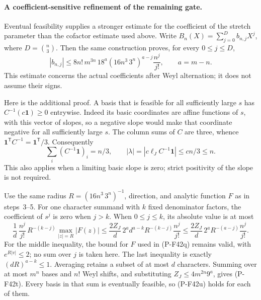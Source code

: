 \documentclass[11pt,a4paper]{article}
\begin{document}
\paragraph{A coefficient-sensitive refinement of the remaining gate.}
Eventual feasibility supplies a stronger estimate for the coefficient
of the stretch parameter than the cofactor estimate used above.
Write \(B_n(X)=\sum_{j=0}^{D}b_{n,j}X^j\), where
\(D=\binom n3\). Then the same construction proves, for every
\(0\le j\le D\),
\[
 |b_{n,j}|
 \le 8n!\,m^{3n}\,18^a
       (16n^3\,3^n)^{a-j}\frac{n^j}{j!},
 \qquad a=m-n.
 \tag{P-F42t}
\]
This estimate concerns the actual coefficients after Weyl
alternation; it does not assume their signs.

Here is the additional proof. A basis that is feasible for all
sufficiently large \(s\) has
\(C^{-1}(c\mathbf1)\ge0\) entrywise. Indeed its basic
coordinates are affine functions of \(s\), with this vector
of slopes, so a negative slope would make that coordinate
negative for all sufficiently large \(s\).
The column sums of \(C\) are three, whence
\(\mathbf1^{\mathsf T}C^{-1}=\mathbf1^{\mathsf T}/3\).
Consequently
\[
 \sum_i (C^{-1}\mathbf1)_i=n/3,
 \qquad
 |\lambda|=|c\ell_JC^{-1}\mathbf1|
              \le cn/3\le n.
 \tag{P-F42u}
\]
This also applies when a limiting basic slope is zero; strict
positivity of the slope is not required.

Use the same radius \(R=(16n^3\,3^n)^{-1}\), direction,
and analytic function \(F\) as in steps~3--5.
For one character summand with \(k\) fixed denominator
factors, the coefficient of \(s^j\) is zero when \(j>k\).
When \(0\le j\le k\), its absolute value is at most
\[
 \frac1d\,\frac{n^j}{j!}\,
       R^{-(k-j)}
       \max_{|z|=R}|F(z)|
 \le
 \frac{2Z_J}{d}\,2^a d^{a-k}
       R^{-(k-j)}\frac{n^j}{j!}
 \le
 \frac{2Z_J}{d}\,2^a
       R^{-(a-j)}\frac{n^j}{j!}.
 \tag{P-F42v}
\]
For the middle inequality, the bound for \(F\) used in
(P-F42q) remains valid, with \(e^{R|v|}\le2\);
no sum over \(j\) is taken here. The last inequality is
exactly \((dR)^{a-k}\le1\).
Averaging retains a subset of at most \(d\) characters.
Summing over at most \(m^n\) bases and \(n!\) Weyl
shifts, and substituting \(Z_J\le4m^{2n}9^a\), gives
(P-F42t). Every basis in that sum is eventually feasible,
so (P-F42u) holds for each of them.
\end{document}
